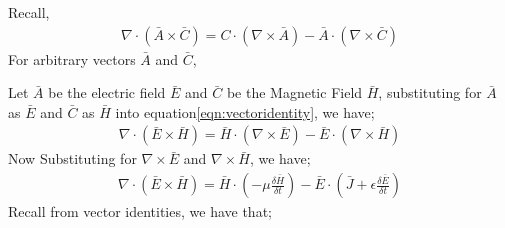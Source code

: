 Recall,
\begin{align}
\nabla \cdot ( \bar{A}\times\bar{C} ) = C \cdot (\nabla\times\bar{A}) - \bar{A}\cdot(\nabla\times\bar{C})
\label{eqn:vectoridentity} 
\end{align} 
For arbitrary vectors $\bar{A}$ and $\bar{C}$,

Let $\bar{A}$ be the electric field $\bar{E}$ and $ \bar{C} $ be the Magnetic Field $\bar{H}$, substituting for $\bar{A}$ as $\bar{E}$ and $\bar{C}$ as $\bar{H}$ into equation\ref{eqn:vectoridentity}, we have;
\begin{align}
\nabla\cdot(\bar{E}\times\bar{H})= \bar{H}\cdot(\nabla\times\bar{E})-\bar{E}\cdot(\nabla\times\bar{H})
\end{align} 
Now Substituting for $\nabla\times\bar{E}$ and $\nabla\times\bar{H}$, we have;
\begin{align}
\nabla\cdot(\bar{E}\times\bar{H})=
\bar{H}\cdot(-\mu\frac{\delta\bar{H}}{\delta t}) - \bar{E}\cdot(\bar{J}+\epsilon\frac{\delta\bar{E}}{\delta t})
\label{eqn:enhpowflow}
\end{align}
Recall from vector identities, we  have that;

